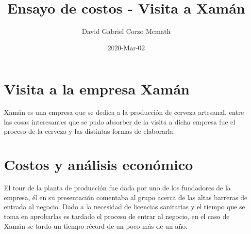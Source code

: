 \documentclass{article}
\title{Ensayo de costos - Visita a Xamán}
\date{2020-Mar-02}
\author{David Gabriel Corzo Mcmath}
\begin{document}
\maketitle
\tikzblockdefinitions

\section{Visita a la empresa Xamán}
Xamán es una empresa que se dedica a la producción de cerveza artesanal, entre las cosas interesantes que se pudo absorber de la visita a dicha empresa fue el proceso de la cerveza y las distintas formas de elaborarla. 


\section{Costos y análisis económico}
El tour de la planta de producción fue dada por uno de los fundadores de la empresa, él en su presentación comentaba al grupo acerca de las altas barreras de entrada al negocio. Dado a la necesidad de licencias sanitarias y el tiempo que se toma en aprobarlas es tardado el proceso de entrar al negocio, en el caso de Xamán se tardo un tiempo récord de un poco más de un año.
\end{document}
